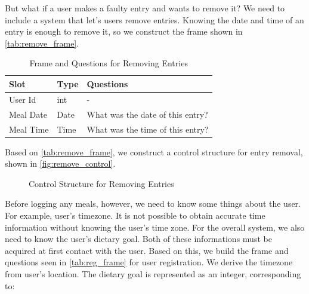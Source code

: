 But what if a user makes a faulty entry and wants to remove it?
We need to include a system that let's users remove entries.
Knowing the date and time of an entry is enough to remove it, so we construct the frame shown in \autoref{tab:remove_frame}.

\begin{table}[htbp]
  \caption[Frame and Questions for Removing Entries]{Frame and Questions for Removing Entries}\label{tab:remove_frame}
  \centering
  \begin{tabular}{l|l|l}
    Slot&Type&Questions\\ \toprule
    User Id&int&-\\ \hline
    Meal Date&Date&What was the date of this entry?\\ \hline
    Meal Time&Time&What was the time of this entry?\\ \hline
  \end{tabular}
\end{table}

Based on \autoref{tab:remove_frame}, we construct a control structure for entry removal, shown in \autoref{fig:remove_control}.

\begin{figure}[htbp]
  \centering
  \caption[Control Structure for Removing Entries]{Control Structure for Removing Entries}
  \label{fig:remove_control}
\end{figure}

\newpage

Before logging any meals, however, we need to know some things about the user.
For example, user's timezone.
It is not possible to obtain accurate time information without knowing the user's time zone.
For the overall system, we also need to know the user's dietary goal.
Both of these informations must be acquired at first contact with the user.
Based on this, we build the frame and questions seen in \autoref{tab:reg_frame} for user registration.
We derive the timezone from user's location.
The dietary goal is represented as an integer, corresponding to:

